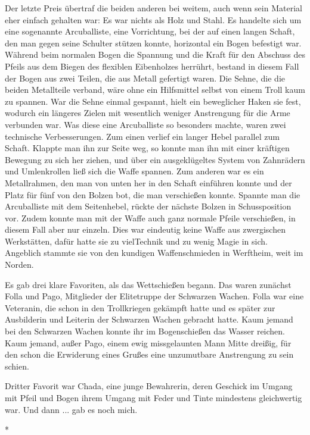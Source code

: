 \documentclass[10pt, a4paper, oneside]{book}
\begin{document}
\begin{multicols}{2}
Der letzte Preis übertraf die beiden anderen bei weitem, auch wenn sein Material eher einfach gehalten war: Es war nichts als Holz und Stahl. Es handelte sich um eine sogenannte Arcuballiste, eine Vorrichtung, bei der auf einen langen Schaft, den man gegen seine Schulter stützen konnte, horizontal ein Bogen befestigt war. Während beim normalen Bogen die Spannung und die Kraft für den Abschuss des Pfeils aus dem Biegen des flexiblen Eibenholzes herrührt, bestand in diesem Fall der Bogen aus zwei Teilen, die aus Metall gefertigt waren. Die Sehne, die die beiden Metallteile verband, wäre ohne ein Hilfsmittel selbst von einem Troll kaum zu spannen. War die Sehne einmal gespannt, hielt ein beweglicher Haken sie fest, wodurch ein längeres Zielen mit wesentlich weniger Anstrengung für die Arme verbunden war. Was diese eine Arcuballiste so besonders machte, waren zwei technische Verbesserungen. Zum einen verlief ein langer Hebel parallel zum Schaft. Klappte man ihn zur Seite weg, so konnte man ihn mit einer kräftigen Bewegung zu sich her ziehen, und über ein ausgeklügeltes System von Zahnrädern und Umlenkrollen ließ sich die Waffe spannen. Zum anderen war es ein Metallrahmen, den man von unten her in den Schaft einführen konnte und der Platz für fünf von den Bolzen bot, die man verschießen konnte. Spannte man die Arcuballiste mit dem Seitenhebel, rückte der nächste Bolzen in Schussposition vor. Zudem konnte man mit der Waffe auch ganz normale Pfeile verschießen, in diesem Fall aber nur einzeln. Dies war eindeutig keine Waffe aus zwergischen Werkstätten, dafür hatte sie zu vielTechnik und zu wenig Magie in sich. Angeblich stammte sie von den kundigen Waffenschmieden in Werftheim, weit im Norden.

Es gab drei klare Favoriten, als das Wettschießen begann. Das waren zunächst Folla und Pago, Mitglieder der Elitetruppe der Schwarzen Wachen. Folla war eine Veteranin, die schon in den Trollkriegen gekämpft hatte und es später zur Ausbilderin und Leiterin der Schwarzen Wachen gebracht hatte. Kaum jemand bei den Schwarzen Wachen konnte ihr im Bogenschießen das Wasser reichen. Kaum jemand, außer Pago, einem ewig missgelaunten Mann Mitte dreißig, für den schon die Erwiderung eines Grußes eine unzumutbare Anstrengung zu sein schien.

Dritter Favorit war Chada, eine junge Bewahrerin, deren Geschick im Umgang mit Pfeil und Bogen ihrem Umgang mit Feder und Tinte mindestens gleichwertig war. Und dann ... gab es noch mich.

\begin{center}
    *
\end{center}


\end{multicols}
\end{document}

